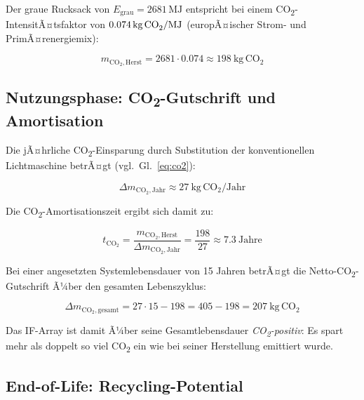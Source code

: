 ﻿\documentclass[12pt, a4paper]{report}
\theoremstyle{definition}
\theoremstyle{remark}
\begin{document}
Der graue Rucksack von $E_{\text{grau}} = 2681\,\text{MJ}$ entspricht bei
einem CO\textsubscript{2}-IntensitÃ¤tsfaktor von $0.074\,\text{kg\,CO}_2/\text{MJ}$
(europÃ¤ischer Strom- und PrimÃ¤renergiemix):

\begin{equation}
  m_{\text{CO}_2,\text{Herst}} = 2681 \cdot 0.074 \approx \SI{198}{\kilo\gram\,\text{CO}_2}
  \label{eq:co2_herst}
\end{equation}

\subsection{\texorpdfstring{Nutzungsphase: CO\textsubscript{2}-Gutschrift und Amortisation}{Nutzungsphase: CO2-Gutschrift und Amortisation}}

Die jÃ¤hrliche CO\textsubscript{2}-Einsparung durch Substitution der
konventionellen Lichtmaschine betrÃ¤gt (vgl.\ Gl.~\eqref{eq:co2}):

\begin{equation}
  \Delta m_{\text{CO}_2,\text{Jahr}} \approx \SI{27}{\kilo\gram\,\text{CO}_2\text{/Jahr}}
\end{equation}

Die CO\textsubscript{2}-Amortisationszeit ergibt sich damit zu:

\begin{equation}
  t_{\text{CO}_2} = \frac{m_{\text{CO}_2,\text{Herst}}}{\Delta m_{\text{CO}_2,\text{Jahr}}}
  = \frac{198}{27} \approx \SI{7.3}{\text{Jahre}}
  \label{eq:t_co2_amort}
\end{equation}

Bei einer angesetzten Systemlebensdauer von 15 Jahren betrÃ¤gt die
Netto-CO\textsubscript{2}-Gutschrift Ã¼ber den gesamten Lebenszyklus:

\begin{equation}
  \Delta m_{\text{CO}_2,\text{gesamt}} = 27 \cdot 15 - 198
  = 405 - 198 = \SI{207}{\kilo\gram\,\text{CO}_2}
  \label{eq:co2_netto}
\end{equation}

Das IF-Array ist damit Ã¼ber seine Gesamtlebensdauer \emph{CO\textsubscript{2}-positiv}:
Es spart mehr als doppelt so viel CO\textsubscript{2} ein wie bei seiner
Herstellung emittiert wurde.

\subsection{End-of-Life: Recycling-Potential}
\end{document}
